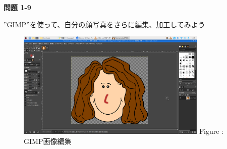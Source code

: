 \documentclass[a4paper,12pt]{jarticle}
\begin{document}
{\bfseries
  問題 1-9}

”GIMP”を使って、自分の顔写真をさらに編集、加工してみよう

\begin{figure}[ht]
  \centering
  \begin{minipage}{9.082cm}
    {\upshape
      \includegraphics[width=9.082cm,height=5.105cm]{textbook-img131.png}
      \newline
      Figure : GIMP画像編集}
  \end{minipage}
\end{figure}

~
\vfill
\clearpage
\end{document}
